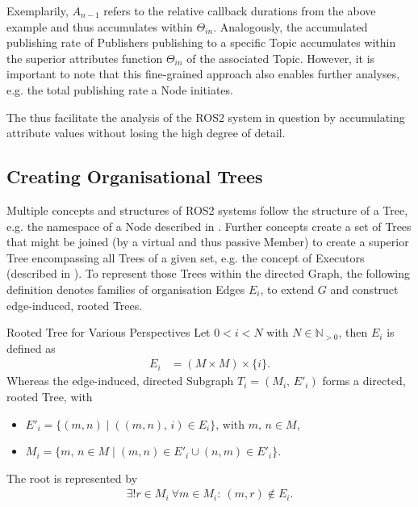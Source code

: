     Exemplarily, $A_{n-1}$ refers to the relative callback durations from the above example and thus accumulates within $\Theta_{in}$. Analogously, the accumulated publishing rate of Publishers publishing to a specific Topic accumulates within the superior attributes function $\Theta_{in}$ of the associated Topic. However, it is important to note that this fine-grained approach also enables further analyses, e.g. the total publishing rate a Node initiates.

    The  thus facilitate the analysis of the ROS2 system in question by accumulating attribute values without losing the high degree of detail.
        

    \subsection{Creating Organisational Trees} \label{subsec:mathModel:trees}
    Multiple concepts and structures of ROS2 systems follow the structure of a Tree, e.g. the namespace of a Node described in . Further concepts create a set of Trees that might be joined (by a virtual and thus passive Member) to create a superior Tree encompassing all Trees of a given set, e.g. the concept of Executors (described in ).
    To represent those Trees within the directed Graph, the following definition denotes families of organisation Edges $E_i$, to extend $G$ and construct edge-induced, rooted Trees.
    \begin{definitionbox}[label=def:ros2edgeInducedTree, list text={Rooted Tree for Various Perspectives}]{Rooted Tree for Various Perspectives \cite[p.~3]{adaPaper}}{}
       Let $0<i<N$ with $N \in \mathbb{N}_{>0}$, then $E_i$ is defined as
        \begin{align*}
            E_i &= (M \times M) \times \{i\}\text{.}
        \end{align*}
        Whereas the edge-induced, directed Subgraph $T_i = (M_i,\,E'_i)$ forms a directed, rooted Tree, with
        \begin{itemize}[label=$\circ$]
            \item $E'_i = \{ (m,n) \mid ((m,n),\, i) \in E_i \} \text{, with } m,\,n\in M$,
            \item $M_i = \{m,\,n\in M \mid (m,n) \in E'_i \cup (n,m) \in E'_i\}$.
        \end{itemize}
        \medskip
        The root is represented by
        \begin{align*}
            \exists !r\in M_i\: \forall m\in M_i\colon\:(m,r)\notin E_i\text{.}
        \end{align*}
    \end{definitionbox}

